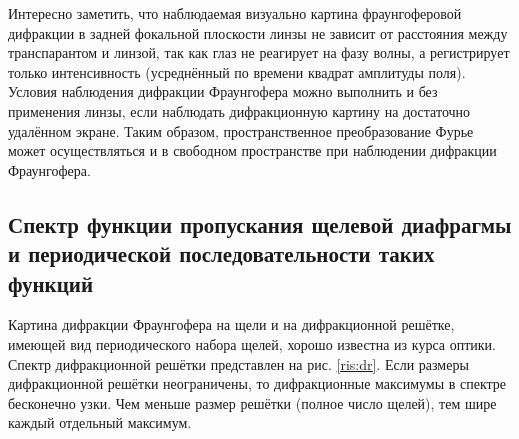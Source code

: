 \documentclass[a5paper,10pt, twoside]{article} %
\begin{document}
		Интересно заметить, что наблюдаемая визуально картина фраунгоферовой дифракции в задней 
		фокальной плоскости линзы не зависит от расстояния между транспарантом и линзой, так как 
		глаз не реагирует на фазу волны, а регистрирует только интенсивность (усреднённый по времени 
		квадрат амплитуды поля). Условия наблюдения дифракции Фраунгофера можно выполнить и без 
		применения линзы, если наблюдать дифракционную картину на достаточно удалённом экране. 
		Таким образом, пространственное преобразование Фурье может осуществляться и в свободном 
		пространстве при наблюдении дифракции Фраунгофера.
		
	\subsection{Спектр функции пропускания щелевой диафрагмы и периодической последовательности таких функций}
		
		Картина дифракции Фраунгофера на щели и на дифракционной решётке, имеющей вид периодического 
		набора щелей, хорошо известна из курса оптики. Спектр дифракционной решётки представлен на 
		рис. \ref{ris:dr}. Если размеры дифракционной решётки неограничены, то дифракционные 
		максимумы в спектре бесконечно узки. Чем меньше размер решётки	(полное число щелей), 
		тем шире каждый отдельный максимум.
		
\end{document}
